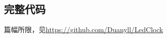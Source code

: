 \documentclass[a4paper,11pt,UTF8]{ctexart}
\begin{document}
\begin{appendix}
    \section{完整代码}

    篇幅所限，见\url{https://github.com/Duanyll/LedClock}

\end{appendix}
\end{document}
